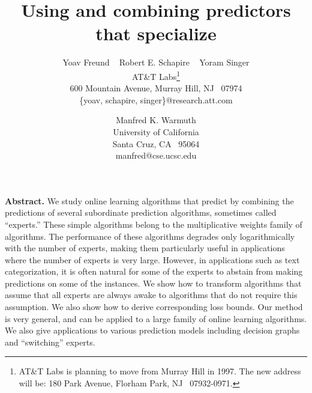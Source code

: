 



\title{Using and combining predictors that specialize}
 
\author{Yoav Freund ~ Robert E. Schapire ~ Yoram Singer \\
		AT\&T Labs\thanks{%
AT\&T Labs is planning to move from Murray Hill in 1997.
The new address will be:
180 Park Avenue, Florham Park, NJ \ 07932-0971.}
\\
		600 Mountain Avenue,
		Murray Hill, NJ \ 07974\\
		\{yoav, schapire, singer\}@research.att.com \\
	\and Manfred K. Warmuth \\
	University of California \\
	Santa Cruz, CA \ 95064\\
	manfred@cse.ucsc.edu
}


\maketitle

{\small
\noindent
{\bf Abstract.}
We study online learning algorithms
that predict by combining the predictions
of several subordinate prediction algorithms, sometimes called
``experts.''
These simple algorithms belong to the multiplicative weights family
of algorithms.
The performance of these algorithms degrades only logarithmically with
the number of experts, making them particularly useful
in applications where the number of experts is very large.
However, in applications such as text categorization, it is often
natural for some of the experts to abstain from making predictions on
some of the instances.
We show how to transform algorithms that assume that
all experts are always awake to algorithms that do not
require this assumption.
We also show how to derive corresponding loss bounds.
Our method is very general, and can be applied to a large family of
online learning algorithms.
We also give applications to various prediction models including
decision graphs and ``switching'' experts.
\par
}

